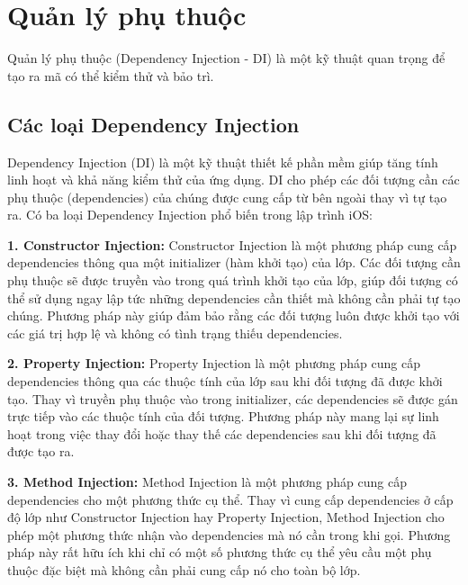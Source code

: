 \section{Quản lý phụ thuộc}
Quản lý phụ thuộc (Dependency Injection - DI) là một kỹ thuật quan trọng để tạo ra mã có thể kiểm thử và bảo trì.

\subsection{Các loại Dependency Injection}

Dependency Injection (DI) là một kỹ thuật thiết kế phần mềm giúp tăng tính linh hoạt và khả năng kiểm thử của ứng dụng. DI cho phép các đối tượng cần các phụ thuộc (dependencies) của chúng được cung cấp từ bên ngoài thay vì tự tạo ra. Có ba loại Dependency Injection phổ biến trong lập trình iOS:

\vspace{0.5em}

\textbf{1. Constructor Injection: }Constructor Injection là một phương pháp cung cấp dependencies thông qua một initializer (hàm khởi tạo) của lớp. Các đối tượng cần phụ thuộc sẽ được truyền vào trong quá trình khởi tạo của lớp, giúp đối tượng có thể sử dụng ngay lập tức những dependencies cần thiết mà không cần phải tự tạo chúng. Phương pháp này giúp đảm bảo rằng các đối tượng luôn được khởi tạo với các giá trị hợp lệ và không có tình trạng thiếu dependencies.

\vspace{0.5em}

\textbf{2. Property Injection: }Property Injection là một phương pháp cung cấp dependencies thông qua các thuộc tính của lớp sau khi đối tượng đã được khởi tạo. Thay vì truyền phụ thuộc vào trong initializer, các dependencies sẽ được gán trực tiếp vào các thuộc tính của đối tượng. Phương pháp này mang lại sự linh hoạt trong việc thay đổi hoặc thay thế các dependencies sau khi đối tượng đã được tạo ra.

\vspace{0.5em}

\textbf{3. Method Injection: }  Method Injection là một phương pháp cung cấp dependencies cho một phương thức cụ thể. Thay vì cung cấp dependencies ở cấp độ lớp như Constructor Injection hay Property Injection, Method Injection cho phép một phương thức nhận vào dependencies mà nó cần trong khi gọi. Phương pháp này rất hữu ích khi chỉ có một số phương thức cụ thể yêu cầu một phụ thuộc đặc biệt mà không cần phải cung cấp nó cho toàn bộ lớp.

